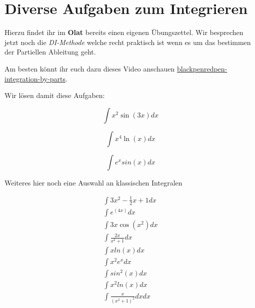 \documentclass{report}
\begin{document}


\section{Diverse Aufgaben zum Integrieren} %
\label{sec:diverse_aufgaben_zum_integrieren}

Hierzu findet ihr im \textbf{Olat} bereits einen eigenen Übungszettel. Wir besprechen jetzt noch die \emph{DI-Methode} welche recht praktisch ist wenn es um das bestimmen der Partiellen Ableitung geht. 

Am besten könnt ihr euch dazu dieses Video anschauen \href{https://www.youtube.com/watch?v=2I-_SV8cwsw&t=684s}{blackpenredpen-integration-by-parts}.

Wir lösen damit diese Aufgaben:

\begin{equation}
    \int x^2 \sin(3x)dx 
\end{equation}

\begin{equation}
  \int   x^4 \ln(x)dx
\end{equation}

\begin{equation}
   \int  e^x sin(x)dx
\end{equation}


Weiteres hier noch eine Auswahl an klassischen Integralen

\begin{align}
    \int 3x^2 - \frac{1}{2}x + 1 dx \\
    \int e^{(4x)}dx \\
    \int 3x \cos(x^2) dx \\
    \int \frac{2x}{x^2 + 1}dx \\
    \int x ln(x) dx \\
    \int x^2 e^x dx \\ 
    \int sin^2(x) dx \\
    \int x^2 ln(x) dx \\
    \int \frac{x}{(x^2 + 1)^2}dx dx 
\end{align}


\end{document}
